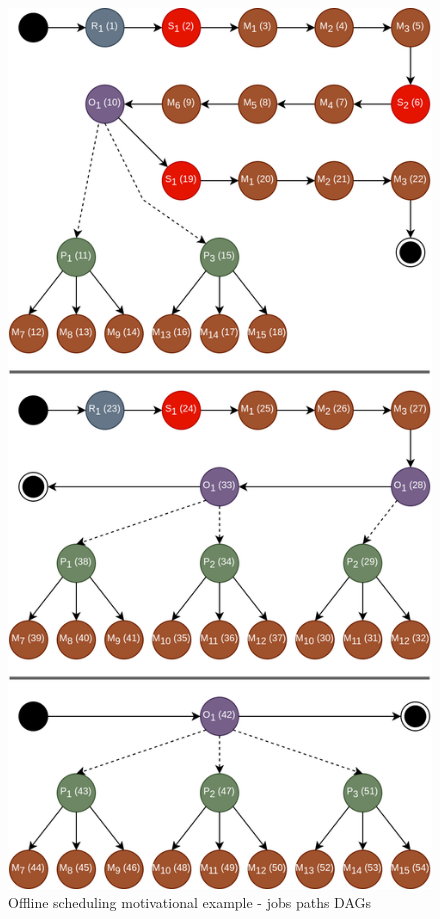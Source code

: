 \begin{figure}[!htbp]
	\centering
	\includegraphics[scale=0.3]{../images/offline_scheduling_jobs.png}
	\caption{Offline scheduling motivational example - jobs paths DAGs}
    \label{fig:offline_scheduling_jobs}
\end{figure}

